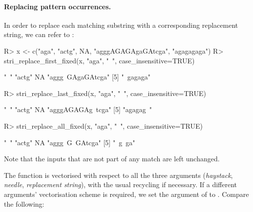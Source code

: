 \documentclass[nojss]{jss}
\begin{document}
\paragraph{Replacing pattern occurrences.}
In order to replace each matching substring with a corresponding
replacement string, we can refer to :

\begin{Schunk}
\begin{Sinput}
R> x <- c("aga", "actg", NA, "agggAGAGAgaGAtcga", "agagagaga")
R> stri_replace_first_fixed(x, "aga", "~", case_insensitive=TRUE)
\end{Sinput}
\begin{Soutput}
[1] "~"               "actg"            NA                "aggg~GAgaGAtcga"
[5] "~gagaga"
\end{Soutput}
\begin{Sinput}
R> stri_replace_last_fixed(x, "aga", "~", case_insensitive=TRUE)
\end{Sinput}
\begin{Soutput}
[1] "~"               "actg"            NA                "agggAGAGAg~tcga"
[5] "agagag~"
\end{Soutput}
\begin{Sinput}
R> stri_replace_all_fixed(x, "aga", "~", case_insensitive=TRUE)
\end{Sinput}
\begin{Soutput}
[1] "~"             "actg"          NA              "aggg~G~GAtcga"
[5] "~g~ga"
\end{Soutput}
\end{Schunk}

Note that the inputs that are not part of any match are left unchanged.

The function is vectorised with respect to all the three arguments
(\textit{haystack}, \textit{needle}, \textit{replacement string}),
with the usual recycling if necessary.
If a different arguments' vectorisation scheme is required,
we set the  argument of 
to .
Compare the following:
\end{document}
